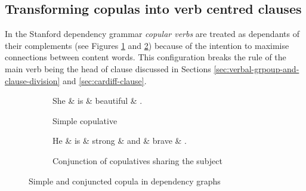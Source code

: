 \subsection{Transforming copulas into verb centred clauses}
\label{sec:copulas}
    In the Stanford dependency grammar \textit{copular verbs} are treated as dependants of their complements (see Figures \ref{fig:copula-simple} and \ref{fig:copula-conj}) because of the intention to maximise connections between content words. This configuration breaks the rule of the main verb being the head of clause discussed in Sections \ref{sec:verbal-grpoup-and-clause-division} and \ref{sec:cardiff-clause}. 

    \begin{figure}
    \centering
        \begin{subfigure}[b]{0.4\textwidth}
        \centering
        \begin{dependency}
        		\begin{deptext}[]
        	She \& is \& beautiful \& . \\%
        		\end{deptext}
        	\end{dependency}
        \caption{Simple copulative}
        \label{fig:copula-simple}
        \end{subfigure}
        \quad
        \begin{subfigure}[b]{0.55\textwidth}
        \centering
        	\begin{dependency}
        		\begin{deptext}[]
        	He \& is \& strong \& and \& brave \& . \\
        		\end{deptext}
        	\end{dependency}
        \caption{Conjunction of copulatives sharing the subject}
        \label{fig:copula-conj}
        \end{subfigure}
         \caption{Simple and conjuncted copula in dependency graphs}
         \label{fig:copula-in-dg}
    \end{figure}
    
